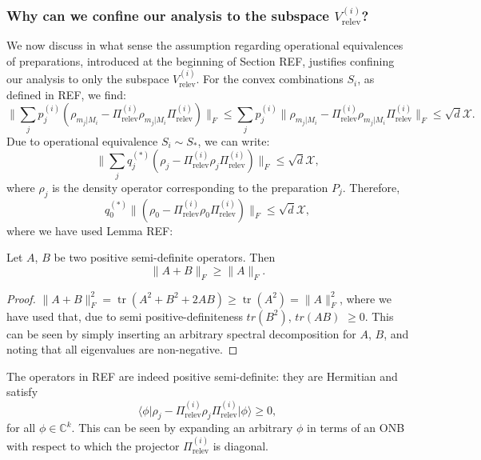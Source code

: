 \subsubsection{Why can we confine our analysis to the subspace $V_{\text{relev}}^{(i)}$?}
We now discuss in what sense the assumption regarding operational equivalences of preparations, introduced at the beginning of Section REF, justifies confining our analysis to only the subspace $V_{\text{relev}}^{(i)}$. 
For the convex combinations $S_i$, as defined in REF, we find:
\begin{equation}
\|\sum_j p_j^{(i)}(\rho_{m_j\vert M_i}-\Pi_{\text{relev}}^{(i)}\rho_{m_j\vert M_i}\Pi_{\text{relev}}^{(i)})\|_F \leq \sum_j p_j^{(i)}\|\rho_{m_j\vert M_i}-\Pi_{\text{relev}}^{(i)}\rho_{m_j\vert M_i}\Pi_{\text{relev}}^{(i)}\|_F \leq \sqrt{d}\mathcal{X}.
\end{equation}
Due to operational equivalence $S_i\sim S_{*}$, we can write:
\begin{equation}
\|\sum_j q_j^{(*)}(\rho_{j}-\Pi_{\text{relev}}^{(i)}\rho_{j}\Pi_{\text{relev}}^{(i)})\|_F \leq \sqrt{d}\mathcal{X},
\end{equation}
where $\rho_{j}$ is the density operator corresponding to the preparation $P_j$.
Therefore,
\begin{equation}
q_0^{(*)}\|(\rho_{0}-\Pi_{\text{relev}}^{(i)}\rho_{0}\Pi_{\text{relev}}^{(i)})\|_F \leq \sqrt{d}\mathcal{X},
\end{equation}
where we have used Lemma REF:
\begin{lemma}
Let $A$, $B$ be two positive semi-definite operators. Then
\begin{equation}
\|A+B\|_F \geq \|A\|_F.
\end{equation}
\end{lemma}
\begin{proof}
$\|A+B\|_F^2=\operatorname{tr}(A^2+B^2+2AB)\geq \operatorname{tr}(A^2)=\|A\|_F^2$, where we have used that, due to semi positive-definiteness $tr(B^2)$, $tr(AB)$ $\geq 0$. This can be seen by simply inserting an arbitrary spectral decomposition for $A$, $B$, and noting that all eigenvalues are non-negative.
\end{proof}
The operators in REF are indeed positive semi-definite: they are Hermitian and satisfy
\begin{equation}
\langle \phi \vert \rho_{j}-\Pi_{\text{relev}}^{(i)}\rho_{j}\Pi_{\text{relev}}^{(i)} \vert \phi \rangle \geq 0,
\end{equation}
for all $\phi\in\mathbb{C}^k$. This can be seen by expanding an arbitrary $\phi$ in terms of an ONB with respect to which the projector $\Pi_{\text{relev}}^{(i)}$ is diagonal.
